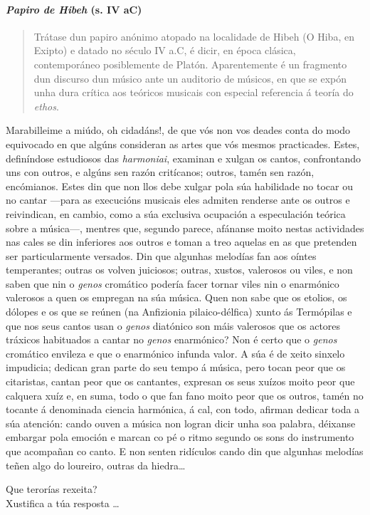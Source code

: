 
\paragraph{\texorpdfstring{\emph{Papiro de Hibeh} (s. IV
aC)}{Papiro de Hibeh (s. IV aC)}}\label{papiro-de-hibeh--s.-iv-ac}

\begin{quote}
Trátase dun papiro anónimo atopado na localidade de Hibeh (O Hiba, en Exipto) e datado no século {\scriptsize IV} a.C, é dicir, en época clásica, contemporáneo posiblemente de Platón. Aparentemente é un fragmento dun discurso dun músico ante un auditorio de músicos, en que se expón unha dura crítica aos teóricos musicais con especial referencia á teoría do \emph{ethos}.
\end{quote}


\begin{multicols}{3}
\setlength{\columnseprule}{1pt}
{\small
\noindent
Marabilleime a miúdo, oh cidadáns!, de que vós non vos deades conta do modo equivocado en que algúns consideran as artes que vós mesmos practicades. Estes, definíndose estudiosos das \emph{harmoniai}, examinan e xulgan os cantos, confrontando uns con outros, e algúns sen
razón critícanos; outros, tamén sen razón, encómianos. Estes din que non llos debe xulgar pola súa habilidade no tocar ou no cantar ---para as execucións musicais eles admiten renderse ante os outros e reivindican, en cambio, como a súa exclusiva ocupación a especulación teórica sobre a música---, mentres que, segundo parece, afánanse moito nestas
actividades nas cales se din inferiores aos outros e toman a treo aquelas en as que pretenden ser particularmente versados. Din que algunhas melodías fan aos oíntes temperantes; outras os volven juiciosos; outras, xustos, valerosos ou viles, e non saben que nin o \emph{genos} cromático podería facer tornar viles nin o enarmónico valerosos a quen os empregan na súa música. Quen non sabe que os etolios, os dólopes e os que se reúnen (na Anfizionia pilaico-délfica) xunto ás Termópilas e que nos seus cantos usan o \emph{genos} diatónico son máis valerosos que os actores tráxicos habituados a cantar no \emph{genos} enarmónico? Non é certo que o \emph{genos} cromático envileza e que o enarmónico infunda valor. A súa é de xeito sinxelo impudicia; dedican gran parte do seu tempo á música, pero tocan peor que os citaristas, cantan peor que os cantantes, expresan os seus xuízos
moito peor que calquera xuíz e, en suma, todo o que fan fano moito peor que os outros, tamén no tocante á denominada ciencia harmónica, á cal, con todo, afirman dedicar toda a súa atención: cando ouven a música non logran dicir unha soa palabra, déixanse embargar pola emoción e marcan co pé o ritmo segundo os sons do instrumento que acompañan co canto. E
non senten ridículos cando din que algunhas melodías teñen algo do loureiro, outras da hiedra\ldots{}
}
\end{multicols}


\begin{ejercicio}[]
Que terorías rexeita?\dotfill \\
Xustifica a túa resposta \ldots
 \vspace*{2.0cm} %
\end{ejercicio}
%

